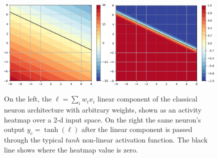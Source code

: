 \documentclass[12pt,oneside]{CUNY_PhD}
\begin{document}
\begin{figure}[!htbp]
    \centering
    \includegraphics[width=0.49\textwidth]{images/2D Activity/2d-linear-activity-cropped.png}
    \includegraphics[width=0.49\textwidth]{images/2D Activity/2d-classic-activity-cropped.png}
    \caption{On the left, the $\ell = \sum_{i}w_i x_i$ linear component of the classical neuron architecture with arbitrary weights, shown as an activity heatmap over a 2-d input space. On the right the same neuron's output $y_c = \tanh(\ell)$  after the linear component is passed through the typical $tanh$ non-linear activation function. The black line shows where the heatmap value is zero.} 
    \label{fig:classic-heatmap}
\end{figure}\\
\end{document}
